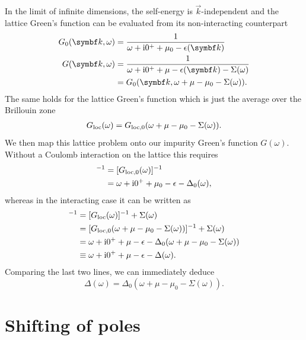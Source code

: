 In the limit of infinite dimensions, the self-energy is $\vec{k}$-independent
and the lattice Green's function can be evaluated from
its non-interacting counterpart
\begin{align}
    G_0(\vec{k},\omega)
     & =
    \frac{1}{\omega + \mi0^+ + \mu_0 - \epsilon(\vec{k})}                \\
    G(\vec{k},\omega)
     & =
    \frac{1}{\omega + \mi0^+ + \mu - \epsilon(\vec{k}) - \Sigma(\omega)} \\
     & =
    G_0(\vec{k},\omega + \mu - \mu_0 - \Sigma(\omega)).
    \label{eq:greens-function-from-self-energy}
\end{align}
The same holds for the lattice Green's function which is just the average over the
Brillouin zone
\begin{align}
    G_{\mathrm{loc}}(\omega)
    =
    G_{\mathrm{loc},0}(\omega + \mu - \mu_0 - \Sigma(\omega)).
\end{align}
We then map this lattice problem onto our impurity Green's function $G(\omega)$.
Without a Coulomb interaction on the lattice this requires
\begin{align}
    [\mathcal{G}_0(\omega)]^{-1}
     & =
    [G_{\mloc,0}(\omega)]^{-1} \\
     & =
    \omega + \mi0^+ + \mu_0 - \epsilon - \Delta_0(\omega),
\end{align}
whereas in the interacting case it can be written as
\begin{align}
    [\mathcal{G}_0(\omega)]^{-1}
     & =
    [G_{\mloc}(\omega)]^{-1} + \Sigma(\omega)                                          \\
     & =
    [G_{\mloc,0}(\omega + \mu - \mu_0 - \Sigma(\omega))]^{-1} + \Sigma(\omega)         \\
     & =
    \omega + \mi0^+ + \mu - \epsilon - \Delta_0(\omega + \mu - \mu_0 - \Sigma(\omega)) \\
     & \equiv
    \omega + \mi0^+ + \mu - \epsilon - \Delta(\omega).
\end{align}
Comparing the last two lines, we can immediately deduce
\begin{equation}
    \Delta(\omega) = \Delta_0(\omega + \mu - \mu_0 - \Sigma(\omega)).
\end{equation}

\section{Shifting of poles}%
\label{app:shifting-of-poles}

